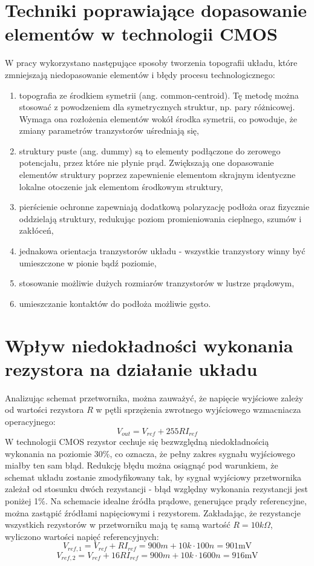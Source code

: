 \documentclass[10pt,a4paper,twoside]{report}
\theoremstyle{definition}
\theoremstyle{definition}
\theoremstyle{definition}
\theoremstyle{definition}
\theoremstyle{definition}
\begin{document}
{{{{{{{	\section{Techniki poprawiające dopasowanie elementów w technologii CMOS}
	{	W pracy wykorzystano następujące sposoby tworzenia topografii układu, które zmniejszają niedopasowanie elementów i błędy procesu technologicznego:
		\begin{enumerate}
			\item topografia ze środkiem symetrii (ang. common-centroid). Tę metodę można stosować z powodzeniem dla symetrycznych struktur, np. pary różnicowej. Wymaga ona rozłożenia elementów wokół środka symetrii, co powoduje, że zmiany parametrów tranzystorów uśredniają się,
			\item struktury puste (ang. dummy) są to elementy podłączone do zerowego potencjału, przez które nie płynie prąd. Zwiększają one dopasowanie elementów struktury poprzez zapewnienie elementom skrajnym identyczne lokalne otoczenie jak elementom środkowym struktury,
			\item pierścienie ochronne zapewniają dodatkową polaryzację podłoża oraz fizycznie oddzielają struktury, redukując poziom promieniowania cieplnego, szumów i zakłóceń,
			\item jednakowa orientacja tranzystorów układu - wszystkie tranzystory winny być umieszczone w pionie bądź poziomie,
			\item stosowanie możliwie dużych rozmiarów tranzystorów w lustrze prądowym,
			\item umieszczanie kontaktów do podłoża możliwie gęsto.
		\end{enumerate}

	
	\section{Wpływ niedokładności wykonania rezystora na działanie układu}
	{	Analizując schemat przetwornika, można zauważyć, że napięcie wyjściowe zależy od wartości rezystora $R$ w pętli sprzężenia zwrotnego wyjściowego wzmacniacza operacyjnego:
		\begin{equation}
			V_{out} =  V_{ref} + 255 R I_{ref}
		\end{equation}
		W technologii CMOS rezystor cechuje się bezwzględną niedokładnością wykonania na poziomie 30\%, co oznacza, że pełny zakres sygnału wyjściowego  miałby ten sam błąd. Redukcję błędu można osiągnąć pod warunkiem, że schemat układu zostanie zmodyfikowany tak, by sygnał wyjściowy przetwornika zależał od stosunku dwóch rezystancji - błąd względny wykonania rezystancji jest poniżej 1\%. 
		Na schemacie idealne źródła prądowe, generujące prądy referencyjne, można zastąpić źródłami napięciowymi i rezystorem. Zakładając, że rezystancje wszystkich rezystorów w przetworniku mają tę samą wartość $R=10k \Omega$, wyliczono wartości napięć referencyjnych:
		\begin{equation}
			V_{ref,1} = V_{ref} + RI_{ref} =900m +  10k \cdot 100n = 901\text{mV}
		\end{equation}
		\begin{equation}
			V_{ref,2} = V_{ref} + 16RI_{ref} = 900m + 10k \cdot 1600n = 916\text{mV}
		\end{equation}		
		}
}}}}}}}}
\end{document}
